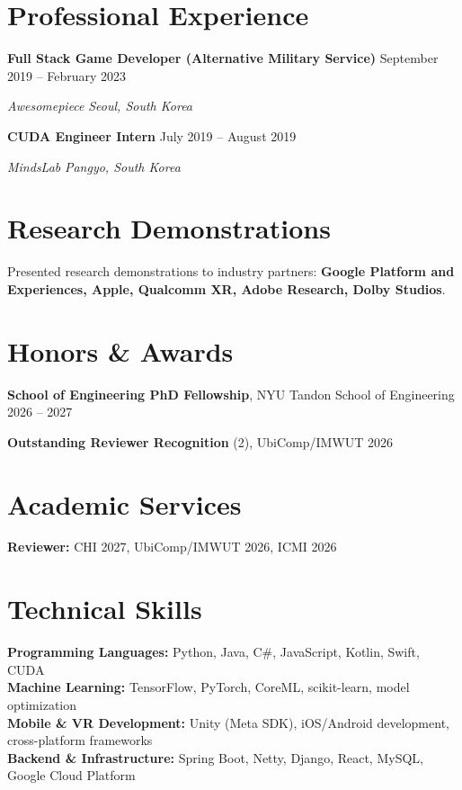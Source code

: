 \documentclass[11pt,letterpaper]{article}
\newcommand{\entry}[4]{%
\textbf{#1} \hfill #2\par
\textit{#3} \hfill \textit{#4}\par
}
\newcommand{\entrygap}{\vspace{8pt}}
\begin{document}
\section{Professional Experience}
\entry{Full Stack Game Developer (Alternative Military Service)}{September 2019 -- February 2023}{Awesomepiece}{Seoul, South Korea}

\entrygap

\entry{CUDA Engineer Intern}{July 2019 -- August 2019}{MindsLab}{Pangyo, South Korea}

\section{Research Demonstrations}
Presented research demonstrations to industry partners: \textbf{Google Platform and Experiences, Apple, Qualcomm XR, Adobe Research, Dolby Studios}.

\section{Honors \& Awards}
\textbf{School of Engineering PhD Fellowship}, NYU Tandon School of Engineering \hfill 2026 -- 2027\par
\vspace{4pt}
\textbf{Outstanding Reviewer Recognition} (2), UbiComp/IMWUT \hfill 2026\par

\section{Academic Services}
\textbf{Reviewer:} CHI 2027, UbiComp/IMWUT 2026, ICMI 2026

\section{Technical Skills}
\textbf{Programming Languages:} Python, Java, C\#, JavaScript, Kotlin, Swift, CUDA \\[4pt]
\textbf{Machine Learning:} TensorFlow, PyTorch, CoreML, scikit-learn, model optimization \\[4pt]
\textbf{Mobile \& VR Development:} Unity (Meta SDK), iOS/Android development, cross-platform frameworks \\[4pt]
\textbf{Backend \& Infrastructure:} Spring Boot, Netty, Django, React, MySQL, Google Cloud Platform
\end{document}
